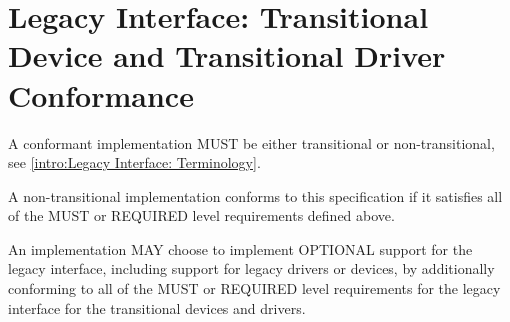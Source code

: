 \section{Legacy Interface: Transitional Device and
Transitional Driver Conformance}\label{sec:Conformance / Legacy
Interface: Transitional Device and 
Transitional Driver Conformance}
A conformant implementation MUST be either transitional or
non-transitional, see \ref{intro:Legacy
Interface: Terminology}.

A non-transitional implementation conforms to this specification
if it satisfies all of the MUST or REQUIRED level requirements
defined above.

An implementation MAY choose to implement OPTIONAL support for the
legacy interface, including support for legacy drivers
or devices, by additionally conforming to all of the MUST or
REQUIRED level requirements for the legacy interface
for the transitional devices and drivers.

